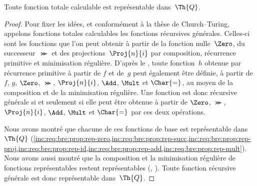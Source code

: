 \documentclass[../../../include/open-logic-section]{subfiles}
\begin{document}

\begin{thm}
Toute fonction totale calculable est représentable dans~$\Th{Q}$.
\end{thm}

\begin{proof}
Pour fixer les idées, et conformément à la thèse de
Church--Turing, appelons fonctions totales calculables les fonctions
récursives générales. Celles-ci sont les fonctions que l'on peut obtenir à
partir de la fonction nulle~$\Zero$, du successeur~$\Succ$ et des
projections~$\Proj{n}{i}$ par composition, récurrence primitive
et minimisation régulière. D'après le
, toute fonction~$h$ obtenue par
récurrence primitive à partir de $f$ et de~$g$ peut également
être définie, à partir de $f$, $g$, $\Zero$, $\Succ$,
$\Proj{n}{i}$, $\Add$, $\Mult$ et $\Char{=}$, au moyen de
la composition et de la minimisation régulière. Une fonction
est donc récursive générale si et seulement si elle peut être
obtenue à partir de $\Zero$, $\Succ$, $\Proj{n}{i}$, $\Add$,
$\Mult$ et $\Char{=}$ par ces deux opérations.

Nous avons montré que chacune de ces fonctions de base est
représentable dans~$\Th{Q}$
(\cref{inc:req:bre:prop:rep-zero,inc:req:bre:prop:rep-succ,inc:req:bre:prop:rep-proj,inc:req:bre:prop:rep-id,inc:req:bre:prop:rep-add,inc:req:bre:prop:rep-mult}).
Nous avons aussi montré que la composition et la minimisation
régulière de fonctions représentables restent représentables
(,
). Toute fonction récursive
générale est donc représentable dans~$\Th{Q}$.
\end{proof}
\end{document}
